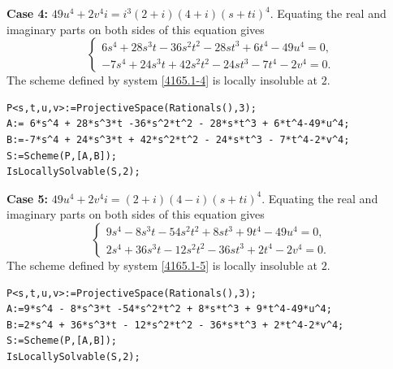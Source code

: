 \documentclass[a4paper,12pt,english,reqno]{amsart}
\begin{document}
{\bf Case 4:} $49u^4+2v^4i=i^3(2+i)(4+i)(s+ti)^4$. Equating the real and imaginary parts on both sides of this equation gives
\begin{equation}\label{4165.1-4}
\begin{cases}
6s^4 + 28s^3t - 36s^2t^2 - 28st^3 + 6t^4 - 49u^4=0,\\
-7s^4 + 24s^3t + 42s^2t^2 - 24st^3 - 7t^4 - 2v^4=0.
\end{cases}
\end{equation}
The scheme defined by system \eqref{4165.1-4} is locally insoluble at $2$.

\begin{lstlisting}
P<s,t,u,v>:=ProjectiveSpace(Rationals(),3);
A:= 6*s^4 + 28*s^3*t -36*s^2*t^2 - 28*s*t^3 + 6*t^4-49*u^4;
B:=-7*s^4 + 24*s^3*t + 42*s^2*t^2 - 24*s*t^3 - 7*t^4-2*v^4;
S:=Scheme(P,[A,B]);
IsLocallySolvable(S,2);
\end{lstlisting}

{\bf Case 5:} $49u^4+2v^4i=(2+i)(4-i)(s+ti)^4$. Equating the real and imaginary parts on both sides of this equation gives
\begin{equation}\label{4165.1-5}
\begin{cases}
9s^4 - 8s^3t - 54s^2t^2 + 8st^3 + 9t^4 - 49u^4=0,\\
2s^4 + 36s^3t - 12s^2t^2 - 36st^3 + 2t^4 - 2v^4=0.
\end{cases}
\end{equation}
The scheme defined by system \eqref{4165.1-5} is locally insoluble at $2$.

\begin{lstlisting}
P<s,t,u,v>:=ProjectiveSpace(Rationals(),3);
A:=9*s^4 - 8*s^3*t -54*s^2*t^2 + 8*s*t^3 + 9*t^4-49*u^4;
B:=2*s^4 + 36*s^3*t - 12*s^2*t^2 - 36*s*t^3 + 2*t^4-2*v^4;
S:=Scheme(P,[A,B]);
IsLocallySolvable(S,2);
\end{lstlisting}
\end{document}
